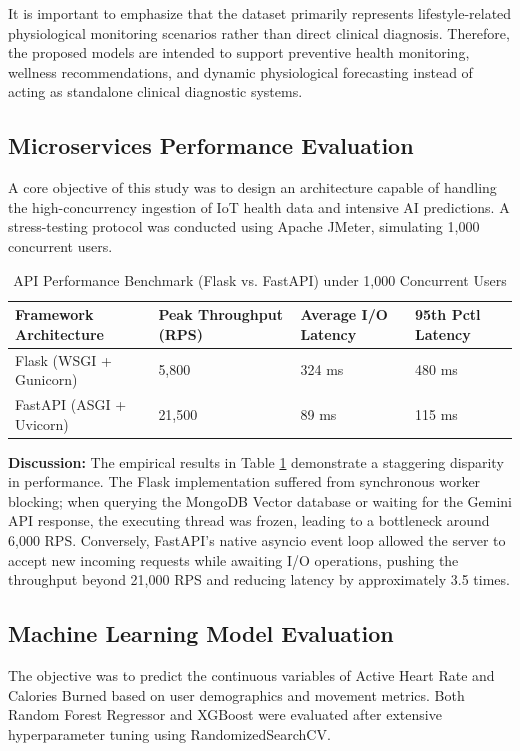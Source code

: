 \documentclass[journal, a4paper]{IEEEtran}
\begin{document}
It is important to emphasize that the dataset primarily represents lifestyle-related physiological monitoring scenarios rather than direct clinical diagnosis. Therefore, the proposed models are intended to support preventive health monitoring, wellness recommendations, and dynamic physiological forecasting instead of acting as standalone clinical diagnostic systems.

\subsection{Microservices Performance Evaluation}
A core objective of this study was to design an architecture capable of handling the high-concurrency ingestion of IoT health data and intensive AI predictions. A stress-testing protocol was conducted using Apache JMeter, simulating 1,000 concurrent users.

\begin{table}[H]
\caption{API Performance Benchmark (Flask vs. FastAPI) under 1,000 Concurrent Users}
\label{tab:performance}
\setlength{\tabcolsep}{3pt}
\begin{tabular}{|p{90pt}|p{50pt}|p{50pt}|p{40pt}|}
\hline
\textbf{Framework Architecture} & \textbf{Peak Throughput (RPS)} & \textbf{Average I/O Latency} & \textbf{95th Pctl Latency} \\
\hline
Flask (WSGI + Gunicorn) & 5,800 & 324 ms & 480 ms \\
FastAPI (ASGI + Uvicorn) & 21,500 & 89 ms & 115 ms \\
\hline
\end{tabular}
\end{table}

\textbf{Discussion:} The empirical results in Table \ref{tab:performance} demonstrate a staggering disparity in performance. The Flask implementation suffered from synchronous worker blocking; when querying the MongoDB Vector database or waiting for the Gemini API response, the executing thread was frozen, leading to a bottleneck around 6,000 RPS. Conversely, FastAPI's native asyncio event loop allowed the server to accept new incoming requests while awaiting I/O operations, pushing the throughput beyond 21,000 RPS and reducing latency by approximately 3.5 times.

\subsection{Machine Learning Model Evaluation}
The objective was to predict the continuous variables of Active Heart Rate and Calories Burned based on user demographics and movement metrics. Both Random Forest Regressor and XGBoost were evaluated after extensive hyperparameter tuning using RandomizedSearchCV.
\end{document}
